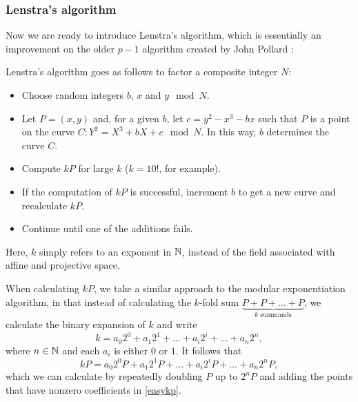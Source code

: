 \subsubsection{Lenstra's algorithm}
Now we are ready to introduce Lenstra's algorithm, which is essentially an improvement on the older $p-1$ algorithm created by John Pollard \cite{tate2013,pollard1974}:
\begin{definition}
	Lenstra's algorithm goes as follows to factor a composite integer $N$:
	\begin{itemize}
		\item Choose random integers $b$, $x$ and $y \mod N$.
		\item Let $P = (x,y)$ and, for a given $b$, let $c = y^2 - x^3 - bx$ such that $P$ is a point on the curve $C: Y^2 = X^3 +bX + c \mod N$.
			In this way, $b$ determines the curve $C$.
		\item Compute $kP$ for large $k$ ($k=10!$, for example).
		\item If the computation of $kP$ is successful, increment $b$ to get a new curve and recalculate $kP$.
		\item Continue until one of the additions fails.
	\end{itemize}
\end{definition}
Here, $k$ simply refers to an exponent in $\mathbb{N}$, instead of the field associated with affine and projective space.

When calculating $kP$, we take a similar approach to the modular exponentiation algorithm, in that instead of calculating the $k$-fold sum $\underbrace{P+P+\ldots+P}_{k\text{ summands}}$, we calculate the binary expansion of $k$ and write
$$k = a_0 2^0 + a_1 2^1 + \ldots + a_i 2^i + \ldots + a_n 2^n,$$
where $n\in\mathbb{N}$ and each $a_i$ is either $0$ or $1$.
It follows that
\begin{equation}
kP = a_0 2^0 P + a_1 2^1 P + \ldots + a_i 2^i P + \ldots + a_n 2^n P,
\label{easykp}
\end{equation}
which we can calculate by repeatedly doubling $P$ up to $2^n P$ and adding the points that have nonzero coefficients in \cref{easykp}.

